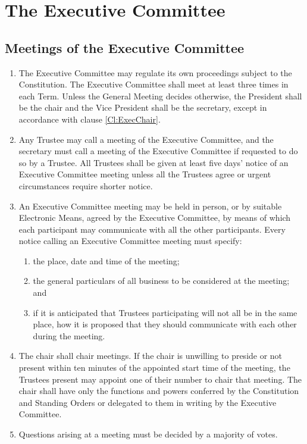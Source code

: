 \documentclass[11pt,a4paper, oneside]{memoir}
\begin{document}
	\chapter{The Executive Committee}
	\section{Meetings of the Executive Committee} \label{Art:TrusteeDecisions}
	\begin{enumerate}
		\item The Executive Committee may regulate its own proceedings subject to the Constitution.  The Executive Committee shall meet at least three times in each Term.
		Unless the General Meeting decides otherwise, the President shall be the chair and the Vice President shall be the secretary, except in accordance with clause \ref{Cl:ExecChair}. 
		\item Any Trustee may call a meeting of the Executive Committee, and the secretary must call a meeting of the Executive Committee if requested to do so by a Trustee.
		All Trustees shall be given at least five days' notice of an Executive Committee meeting unless all the Trustees agree or urgent circumstances require shorter notice.
		\item An Executive Committee meeting may be held in person, or by suitable Electronic Means, agreed by the Executive Committee, by means of which each participant may communicate with all the other participants.
		Every notice calling an Executive Committee meeting must specify:
		\begin{enumerate}
			\item the place, date and time of the meeting;
			\item the general particulars of all business to be considered at the meeting; and
			\item if it is anticipated that Trustees participating will not all be in the same place, how it is proposed that they should communicate with each other during the meeting.
		\end{enumerate}
		\item \label{Cl:ExecChair} The chair shall chair meetings.
		If the chair is unwilling to preside or not present within ten minutes of the appointed start time of the meeting, the Trustees present may appoint one of their number to chair that meeting.
		The chair shall have only the functions and powers conferred by the Constitution and Standing Orders or delegated to them in writing by the Executive Committee.
		\item Questions arising at a meeting must be decided by a majority of votes.

\end{enumerate}
\end{document}
